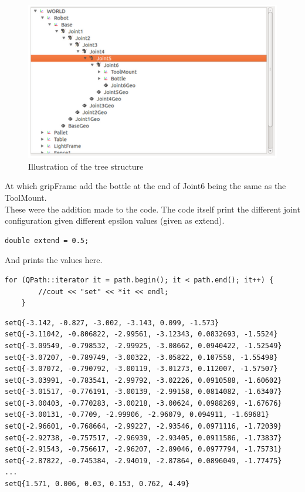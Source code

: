 \documentclass[11pt]{article}
\begin{document}
\begin{figure}[H]
\centering
\includegraphics[scale=0.4]{img/Selection_051.png}
\caption{Illustration of the tree structure}
\label{fig::rrt}
\end{figure}

\noindent At which gripFrame add the bottle at the end of Joint6 being the same as the ToolMount.\\[0.2cm] 

\noindent These were the addition made to the code. The code itself print the different joint configuration given different epsilon values (given as extend).

\begin{lstlisting}
double extend = 0.5;
\end{lstlisting}

\noindent And prints the values here. 
\begin{lstlisting}
for (QPath::iterator it = path.begin(); it < path.end(); it++) {
        //cout << "set" << *it << endl;
    }
\end{lstlisting}

\begin{lstlisting}
setQ{-3.142, -0.827, -3.002, -3.143, 0.099, -1.573}
setQ{-3.11042, -0.806822, -2.99561, -3.12343, 0.0832693, -1.5524}
setQ{-3.09549, -0.798532, -2.99925, -3.08662, 0.0940422, -1.52549}
setQ{-3.07207, -0.789749, -3.00322, -3.05822, 0.107558, -1.55498}
setQ{-3.07072, -0.790792, -3.00119, -3.01273, 0.112007, -1.57507}
setQ{-3.03991, -0.783541, -2.99792, -3.02226, 0.0910588, -1.60602}
setQ{-3.01517, -0.776191, -3.00139, -2.99158, 0.0814082, -1.63407}
setQ{-3.00403, -0.770283, -3.00218, -3.00624, 0.0988269, -1.67676}
setQ{-3.00131, -0.7709, -2.99906, -2.96079, 0.094911, -1.69681}
setQ{-2.96601, -0.768664, -2.99227, -2.93546, 0.0971116, -1.72039}
setQ{-2.92738, -0.757517, -2.96939, -2.93405, 0.0911586, -1.73837}
setQ{-2.91543, -0.756617, -2.96207, -2.89046, 0.0977794, -1.75731}
setQ{-2.87822, -0.745384, -2.94019, -2.87864, 0.0896049, -1.77475}
...
setQ{1.571, 0.006, 0.03, 0.153, 0.762, 4.49}
\end{lstlisting}
\end{document}
